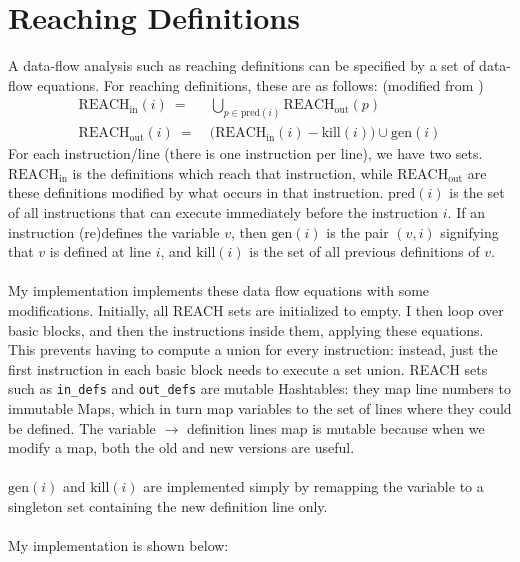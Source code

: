 \documentclass[12pt,notitlepage]{report}
\newcommand{\camlinline}{\texttt}
\begin{document}
\section{Reaching Definitions}
\label{sample:reach}
A data-flow analysis such as reaching definitions can be specified by a set of data-flow equations. For reaching definitions, these are as follows: (modified from \cite{Reaching_defs} )
\begin{align*}
\text{REACH}_{\text{in}} (i) \ = &\ \bigcup_{p \in \text{pred}(i)} \text{REACH}_\text{out} (p) \\
\text{REACH}_{\text{out}} (i) \ = &\ \big( \text{REACH}_\text{in} (i) - \text{kill}(i) \big) \cup \text{gen}(i) 
\end{align*}
For each instruction/line (there is one instruction per line), we have two sets. $\text{REACH}_\text{in}$ is the definitions which reach that instruction, while $\text{REACH}_\text{out}$ are these definitions modified by what occurs in that instruction. $\text{pred}(i)$ is the set of all instructions that can execute immediately before the instruction $i$. If an instruction (re)defines the variable $v$, then $\text{gen}(i)$ is the pair $(v,i)$ signifying that $v$ is defined at line $i$, and $\text{kill}(i)$ is the set of all previous definitions of $v$.
\\\\
My implementation implements these data flow equations with some modifications. Initially, all REACH sets are initialized to empty. I then loop over basic blocks, and then the instructions inside them, applying these equations. This prevents having to compute a union for every instruction: instead, just the first instruction in each basic block needs to execute a set union. REACH sets such as \camlinline{in_defs} and \camlinline{out_defs} are mutable Hashtables: they map line numbers to immutable Maps, which in turn map variables to the set of lines where they could be defined. The variable $\rightarrow$ definition lines map is mutable because when we modify a map, both the old and new versions are useful.
\\\\
$\text{gen}(i)$ and $\text{kill}(i)$ are implemented simply by remapping the variable to a singleton set containing the new definition line only.
\\\\
My implementation is shown below:
\end{document}
